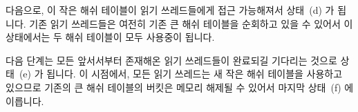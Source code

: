 \fi

다음으로, 이 작은 해쉬 테이블이 읽기 쓰레드들에게 접근 가능해져서 상태~(d) 가
됩니다.
기존 읽기 쓰레드들은 여전히 기존 큰 해쉬 테이블을 순회하고 있을 수 있어서 이
상태에서는 두 해쉬 테이블이 모두 사용중이 됩니다.

다음 단계는 모든 앞서서부터 존재해온 읽기 쓰레드들이 완료되길 기다리는 것으로
상태~(e) 가 됩니다.
이 시점에서, 모든 읽기 쓰레드는 새 작은 해쉬 테이블을 사용하고 있으므로 기존의
큰 해쉬 테이블의 버킷은 메모리 해제될 수 있어서 마지막 상태~(f) 에 이릅니다.

